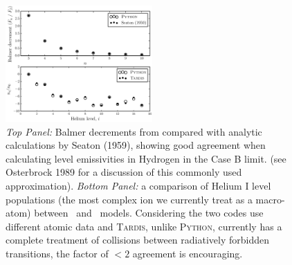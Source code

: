 \documentclass[preprint, a4paper, 11pt]{aastex}
\begin{document}
\begin{figure}
\centering
\includegraphics[width=0.5\textwidth]{figures/fig_caseb_tardis.eps}
\caption{
{\sl Top Panel:} Balmer decrements from \py compared with analytic calculations
by Seaton (1959), showing good agreement when calculating level emissivities in Hydrogen
in the Case B limit.
(see Osterbrock 1989 for a discussion of this commonly used approximation).
{\sl Bottom Panel:}  a comparison of Helium I level populations (the most complex ion we currently 
treat as a macro-atom) between \py~and \tar~models. Considering the 
two codes use different atomic data and \textsc{Tardis,} unlike \textsc{Python,} currently has 
a complete treatment of collisions between radiatively forbidden transitions, the factor of 
$<2$ agreement is encouraging. 
}
\label{tests}
\end{figure}
\nocite{osterbrock}
\nocite{seaton1959}





%





%
%
\end{document}
